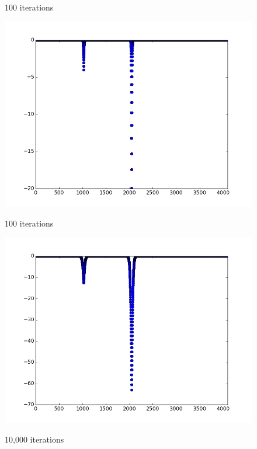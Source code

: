 \documentclass{article}
\begin{document}
\begin{figure}
\begin{minipage}{0.45\textwidth}
    \label{fig:it10}
  \end{minipage}
  \begin{minipage}{0.45\textwidth}
    \caption{100 iterations}
    \includegraphics[width=1\linewidth, natwidth=800, natheight=600]{graphs/it100.png}
    \label{fig:it100}
  \end{minipage}
  \begin{minipage}{0.45\textwidth}
    \caption{100 iterations}
    \includegraphics[width=1\linewidth, natwidth=800, natheight=600]{graphs/it1000.png}
    \label{fig:it1000}
  \end{minipage}
  \begin{minipage}{0.45\textwidth}
  \caption{10,000 iterations}

\end{minipage}
\end{figure}
\end{document}
